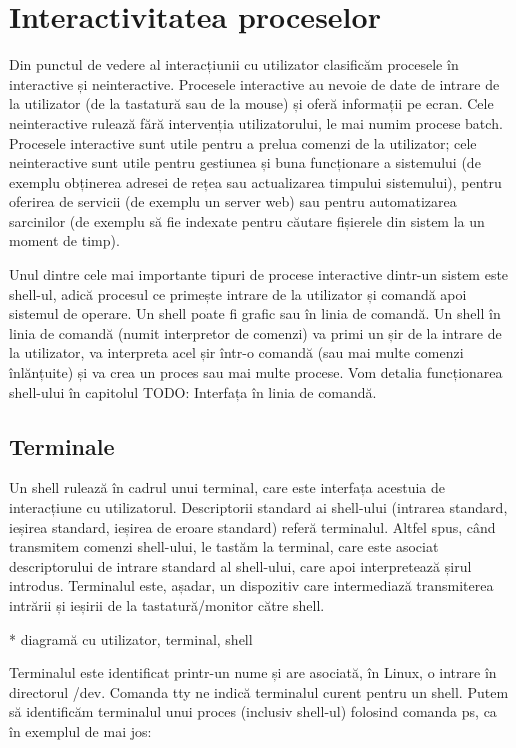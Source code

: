 \section{Interactivitatea proceselor}
\label{sec:procese-interactivitate}

Din punctul de vedere al interacțiunii cu utilizator clasificăm procesele în
interactive și neinteractive. Procesele interactive au nevoie de date de intrare
de la utilizator (de la tastatură sau de la mouse) și oferă informații pe ecran.
Cele neinteractive rulează fără intervenția utilizatorului, le mai numim procese
batch. Procesele interactive sunt utile pentru a prelua comenzi de la
utilizator; cele neinteractive sunt utile pentru gestiunea și buna funcționare a
sistemului (de exemplu obținerea adresei de rețea sau actualizarea timpului
sistemului), pentru oferirea de servicii (de exemplu un server web) sau pentru
automatizarea sarcinilor (de exemplu să fie indexate pentru căutare fișierele
din sistem la un moment de timp).

Unul dintre cele mai importante tipuri de procese interactive dintr-un sistem
este shell-ul, adică procesul ce primește intrare de la utilizator și comandă
apoi sistemul de operare. Un shell poate fi grafic sau în linia de comandă. Un
shell în linia de comandă (numit interpretor de comenzi) va primi un șir de la
intrare de la utilizator, va interpreta acel șir într-o comandă (sau mai multe
comenzi înlănțuite) și va crea un proces sau mai multe procese. Vom detalia
funcționarea shell-ului în capitolul TODO: Interfața în linia de comandă.

\subsection{Terminale}
\label{sec:procese-interactivitate-terminale}

Un shell rulează în cadrul unui terminal, care este interfața acestuia de
interacțiune cu utilizatorul. Descriptorii standard ai shell-ului (intrarea
standard, ieșirea standard, ieșirea de eroare standard) referă terminalul.
Altfel spus, când transmitem comenzi shell-ului, le tastăm la terminal, care
este asociat descriptorului de intrare standard al shell-ului, care apoi
interpretează șirul introdus. Terminalul este, așadar, un dispozitiv care
intermediază transmiterea intrării și ieșirii de la tastatură/monitor către
shell.

* diagramă cu utilizator, terminal, shell

Terminalul este identificat printr-un nume și are asociată, în Linux, o intrare
în directorul /dev. Comanda tty ne indică terminalul curent pentru un shell.
Putem să identificăm terminalul unui proces (inclusiv shell-ul) folosind comanda
ps, ca în exemplul de mai jos:

